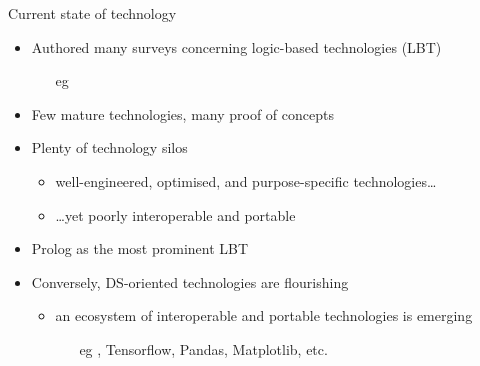 \documentclass[presentation]{beamer}\mode<presentation>{\usetheme{AMSBolognaFC}}
\begin{document}
\begin{frame}{Current state of technology}
    \begin{itemize}

        \item Authored many surveys concerning logic-based technologies (LBT)
        \begin{itemize}
            \item[eg] 
        \end{itemize}
        
        \vfill

        \item Few mature technologies, many proof of concepts
        
        \vfill

        \item Plenty of technology silos
        \begin{itemize}
            \item well-engineered, optimised, and purpose-specific technologies\ldots
            \item \dots yet poorly interoperable and portable
        \end{itemize}
        
        \vfill

        \item Prolog as the most prominent LBT
        
        \vfill

        \item Conversely, DS-oriented technologies are flourishing
        \begin{itemize}
            \item an ecosystem of interoperable and portable technologies is emerging
            \begin{itemize}
                \item[eg] \scikit{}, Tensorflow, Pandas, Matplotlib, etc.
            \end{itemize}
        \end{itemize}
    \end{itemize}
\end{frame}
\end{document}
